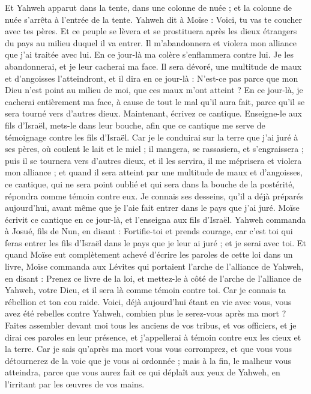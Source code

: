\begin{multicols}{2}
Et Yahweh apparut dans la tente, dans une colonne de nuée ; et la colonne de nuée s'arrêta à l'entrée de la tente.
Yahweh dit à Moïse : Voici, tu vas te coucher avec tes pères. Et ce peuple se lèvera et se prostituera après les dieux étrangers du pays au milieu duquel il va entrer. Il m'abandonnera et violera mon alliance que j'ai traitée avec lui.
En ce jour-là ma colère s'enflammera contre lui. Je les abandonnerai, et je leur cacherai ma face. Il sera dévoré, une multitude de maux et d’angoisses l’atteindront, et il dira en ce jour-là : N'est-ce pas parce que mon Dieu n'est point au milieu de moi, que ces maux m'ont atteint ?
En ce jour-là, je cacherai entièrement ma face, à cause de tout le mal qu'il aura fait, parce qu'il se sera tourné vers d'autres dieux.
Maintenant, écrivez ce cantique. Enseigne-le aux fils d'Israël, mets-le dans leur bouche, afin que ce cantique me serve de témoignage contre les fils d'Israël.
Car je le conduirai sur la terre que j'ai juré à ses pères, où coulent le lait et le miel ; il mangera, se rassasiera, et s’engraissera ; puis il se tournera vers d'autres dieux, et il les servira, il me méprisera et violera mon alliance ;
et quand il sera atteint par une multitude de maux et d’angoisses, ce cantique, qui ne sera point oublié et qui sera dans la bouche de la postérité, répondra comme témoin contre eux. Je connais ses desseins, qu'il a déjà préparés aujourd'hui, avant même que je l’aie fait entrer dans le pays que j'ai juré.
Moïse écrivit ce cantique en ce jour-là, et l'enseigna aux fils d'Israël.
Yahweh commanda à Josué, fils de Nun, en disant : Fortifie-toi et prends courage, car c'est toi qui feras entrer les fils d'Israël dans le pays que je leur ai juré ; et je serai avec toi.
Et quand Moïse eut complètement achevé d'écrire les paroles de cette loi dans un livre,
Moïse commanda aux Lévites qui portaient l'arche de l'alliance de Yahweh, en disant :
Prenez ce livre de la loi, et mettez-le à côté de l'arche de l'alliance de Yahweh, votre Dieu, et il sera là comme témoin contre toi.
Car je connais ta rébellion et ton cou raide. Voici, déjà aujourd'hui étant en vie avec vous, vous avez été rebelles contre Yahweh, combien plus le serez-vous après ma mort ?
Faites assembler devant moi tous les anciens de vos tribus, et vos officiers, et je dirai ces paroles en leur présence, et j'appellerai à témoin contre eux les cieux et la terre.
Car je sais qu'après ma mort vous vous corromprez, et que vous vous détournerez de la voie que je vous ai ordonnée ; mais à la fin, le malheur vous atteindra, parce que vous aurez fait ce qui déplaît aux yeux de Yahweh, en l'irritant par les œuvres de vos mains.

\end{multicols}
